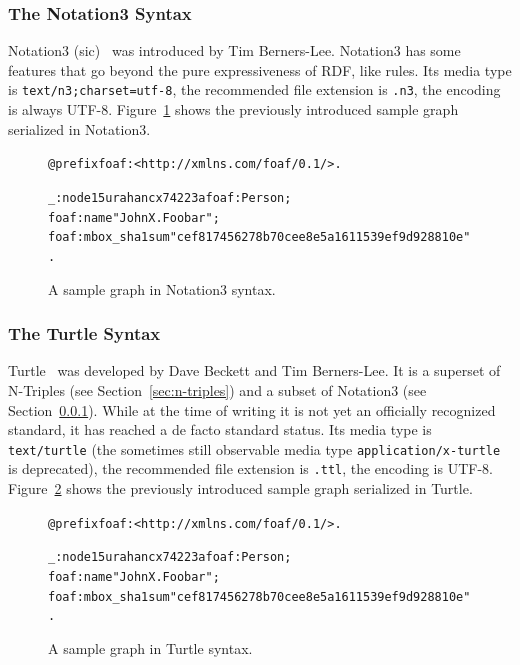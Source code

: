 \documentclass[12pt]{article}
\newenvironment{code}[1]
{\begin{lrbox}{\inverbatim}\begin{minipage}{13.5cm}\begin{alltt}{#1}}
{\end{alltt}\end{minipage}\end{lrbox}\colorbox{lightgray}{\usebox{\inverbatim}}}
\begin{document}
\subsubsection{The Notation3 Syntax} \label{sec:notation3}
Notation3 (sic)~\cite{BernersLee2008} was introduced by Tim Berners-Lee. Notation3 has some features that go beyond the pure expressiveness of RDF, like rules. Its media type is \texttt{text/n3;\-charset=utf-8}, the recommended file extension is \texttt{.n3}, the encoding is always UTF-8. Figure~\ref{code:notation3-syntax} shows the previously introduced sample graph serialized in Notation3.
\begin{figure}[htbp!]
\begin{center}
{\footnotesize
\begin{code}
@prefix foaf: <http://xmlns.com/foaf/0.1/> .

_:node15urahancx74223 a foaf:Person ;
  foaf:name "John X. Foobar" ;
  foaf:mbox_sha1sum "cef817456278b70cee8e5a1611539ef9d928810e" .
\end{code}}
  \caption{A sample graph in Notation3 syntax.}
  \label{code:notation3-syntax}
  \end{center}  
\end{figure}

\subsubsection{The Turtle Syntax} \label{sec:turtle}
Turtle~\cite{turtle} was developed by Dave Beckett and Tim Berners-Lee. It is a superset of N-Triples (see Section~\ref{sec:n-triples}) and a subset of Notation3 (see Section~\ref{sec:notation3}). While at the time of writing it is not yet an officially recognized standard, it has reached a de facto standard status. Its media type is \texttt{text/turtle} (the sometimes still observable media type \texttt{application/x-turtle} is deprecated), the recommended file extension is \texttt{.ttl}, the encoding is UTF-8. Figure~\ref{code:turtle-syntax} shows the previously introduced sample graph serialized in Turtle.

\begin{figure}[htbp!]
\begin{center}
{\footnotesize
\begin{code}
@prefix foaf: <http://xmlns.com/foaf/0.1/> .

_:node15urahancx74223 a foaf:Person ;
  foaf:name "John X. Foobar" ;
  foaf:mbox_sha1sum "cef817456278b70cee8e5a1611539ef9d928810e" .
\end{code}}
  \caption{A sample graph in Turtle syntax.}
  \label{code:turtle-syntax}
  \end{center}  
\end{figure}
\end{document}
